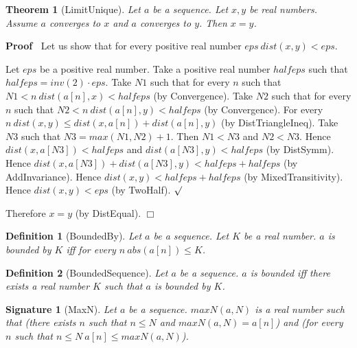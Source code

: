\documentclass{article}
\newenvironment{forthel}{\begin{leftbar}}{\end{leftbar}}
\newenvironment{proof}{\noindent\textbf{Proof\ }}{\hspace*{\fill}$\Box$\medskip}
\newenvironment{subproof}{\begin{list}{}{}
		\item[\text{Proof}]}{\hfill $\surd$ \end{list}}
\newtheorem{theorem}{Theorem}
\newtheorem{definition}{Definition}
\newtheorem{signature}{Signature}
\begin{document}
\begin{forthel}
	\begin{theorem} [LimitUnique]
	Let $a$ be a sequence. Let $x, y$ be real numbers. Assume $a$ converges to $x$ and $a$ converges to $y$.
	Then $x = y$.
	\end{theorem}
	\begin{proof}
	Let us show that for every positive real number $eps \ dist(x,y) < eps$.
	\begin{subproof}
	Let $eps$ be a positive real number.
	Take a positive real number $halfeps$ such that $halfeps = inv(2) \cdot eps$.
	Take $N1$ such that for every $n$ such that $N1 < n \ dist(a[n],x) < halfeps$ (by Convergence).
	Take $N2$ such that for every $n$ such that $N2 < n \ dist(a[n],y) < halfeps$ (by Convergence).
	For every $n \ dist(x,y) \leq dist(x,a[n]) + dist(a[n],y)$ (by DistTriangleIneq). 
	Take $N3$ such that $N3 = max(N1,N2) + 1$.
	Then $N1 < N3$ and $N2 < N3$.
	Hence $dist(x,a[N3]) < halfeps$ and $dist(a[N3],y) < halfeps$ (by DistSymm).
	Hence $dist(x,a[N3]) + dist(a[N3],y) < halfeps + halfeps$ (by AddInvariance).
	Hence $dist(x,y) < halfeps + halfeps$ (by MixedTransitivity).
	Hence $dist(x,y) < eps$ (by TwoHalf).
	\end{subproof}
	Therefore $x = y$ (by DistEqual).
	\end{proof}
	
	\begin{definition} [BoundedBy]
	Let $a$ be a sequence. Let $K$ be a real number. $a$ is bounded by $K$ iff
	for every $n \ abs(a[n]) \leq K$.
	\end{definition}
	
	\begin{definition} [BoundedSequence]
	Let $a$ be a sequence. $a$ is bounded iff there exists a real number $K$ such that
	$a$ is bounded by $K$.
	\end{definition}
	
	\begin{signature} [MaxN]
	Let $a$ be a sequence. $maxN(a,N)$ is a real number such that
	(there exists $n$ such that $n \leq N$ and $maxN(a,N) = a[n]$) and
	(for every $n$ such that $n \leq N \ a[n] \leq maxN(a,N)$).
	\end{signature}
	

\end{forthel}
\end{document}

